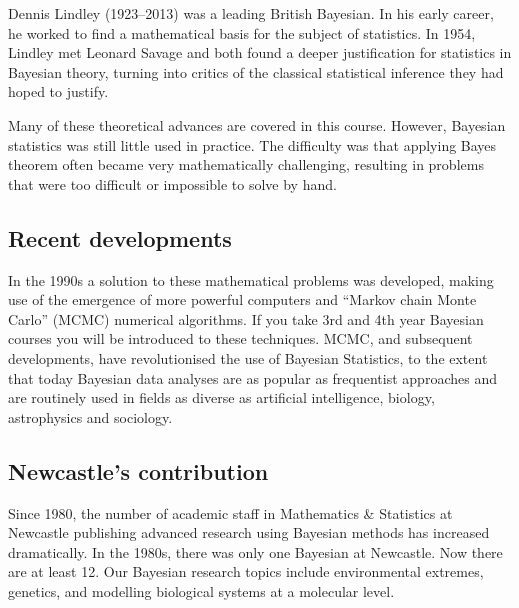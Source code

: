 Dennis Lindley (1923--2013) was a leading British Bayesian.
In his early career, he worked to find a mathematical basis for the subject of statistics.
In 1954, Lindley met Leonard Savage and both found a deeper justification for statistics in Bayesian theory, turning into critics of the classical statistical inference they had hoped to justify.


Many of these theoretical advances are covered in this course.
However, Bayesian statistics was still little used in practice.
The difficulty was that applying Bayes theorem often became very mathematically challenging,
resulting in problems that were too difficult or impossible to solve by hand.
\subsection*{Recent developments}
In the 1990s a solution to these mathematical problems was developed, making use of the emergence of more powerful computers and ``Markov chain Monte Carlo'' (MCMC) numerical algorithms.
If you take 3rd and 4th year Bayesian courses you will be introduced to these techniques.
MCMC, and subsequent developments, have revolutionised the use of Bayesian Statistics, to
the extent that today Bayesian data analyses are as popular as frequentist approaches and are routinely used in fields as diverse as artificial intelligence, biology, astrophysics and sociology.

\subsection*{Newcastle's contribution}
Since 1980, the number of academic staff in Mathematics \& Statistics at Newcastle publishing advanced research using Bayesian methods has increased dramatically. In the 1980s, there was only one Bayesian at Newcastle. Now there are at least 12.
Our Bayesian research topics include environmental extremes, genetics, and modelling biological systems at a molecular level.
